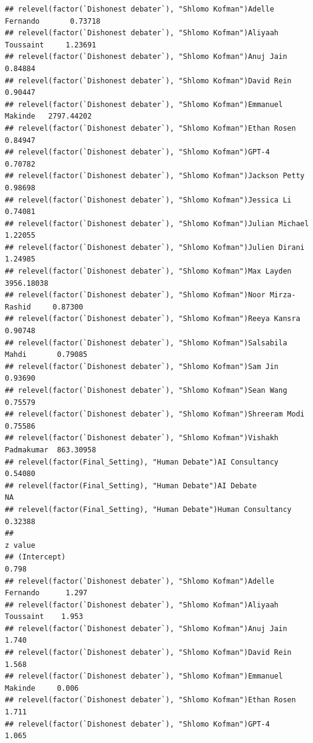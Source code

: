 \documentclass[
]{article}
\begin{document}
\begin{verbatim}
## relevel(factor(`Dishonest debater`), "Shlomo Kofman")Adelle Fernando       0.73718
## relevel(factor(`Dishonest debater`), "Shlomo Kofman")Aliyaah Toussaint     1.23691
## relevel(factor(`Dishonest debater`), "Shlomo Kofman")Anuj Jain             0.84884
## relevel(factor(`Dishonest debater`), "Shlomo Kofman")David Rein            0.90447
## relevel(factor(`Dishonest debater`), "Shlomo Kofman")Emmanuel Makinde   2797.44202
## relevel(factor(`Dishonest debater`), "Shlomo Kofman")Ethan Rosen           0.84947
## relevel(factor(`Dishonest debater`), "Shlomo Kofman")GPT-4                 0.70782
## relevel(factor(`Dishonest debater`), "Shlomo Kofman")Jackson Petty         0.98698
## relevel(factor(`Dishonest debater`), "Shlomo Kofman")Jessica Li            0.74081
## relevel(factor(`Dishonest debater`), "Shlomo Kofman")Julian Michael        1.22055
## relevel(factor(`Dishonest debater`), "Shlomo Kofman")Julien Dirani         1.24985
## relevel(factor(`Dishonest debater`), "Shlomo Kofman")Max Layden         3956.18038
## relevel(factor(`Dishonest debater`), "Shlomo Kofman")Noor Mirza-Rashid     0.87300
## relevel(factor(`Dishonest debater`), "Shlomo Kofman")Reeya Kansra          0.90748
## relevel(factor(`Dishonest debater`), "Shlomo Kofman")Salsabila Mahdi       0.79085
## relevel(factor(`Dishonest debater`), "Shlomo Kofman")Sam Jin               0.93690
## relevel(factor(`Dishonest debater`), "Shlomo Kofman")Sean Wang             0.75579
## relevel(factor(`Dishonest debater`), "Shlomo Kofman")Shreeram Modi         0.75586
## relevel(factor(`Dishonest debater`), "Shlomo Kofman")Vishakh Padmakumar  863.30958
## relevel(factor(Final_Setting), "Human Debate")AI Consultancy               0.54080
## relevel(factor(Final_Setting), "Human Debate")AI Debate                         NA
## relevel(factor(Final_Setting), "Human Debate")Human Consultancy            0.32388
##                                                                         z value
## (Intercept)                                                               0.798
## relevel(factor(`Dishonest debater`), "Shlomo Kofman")Adelle Fernando      1.297
## relevel(factor(`Dishonest debater`), "Shlomo Kofman")Aliyaah Toussaint    1.953
## relevel(factor(`Dishonest debater`), "Shlomo Kofman")Anuj Jain            1.740
## relevel(factor(`Dishonest debater`), "Shlomo Kofman")David Rein           1.568
## relevel(factor(`Dishonest debater`), "Shlomo Kofman")Emmanuel Makinde     0.006
## relevel(factor(`Dishonest debater`), "Shlomo Kofman")Ethan Rosen          1.711
## relevel(factor(`Dishonest debater`), "Shlomo Kofman")GPT-4                1.065

\end{verbatim}
\end{document}
